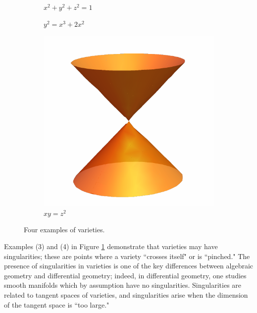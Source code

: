 \documentclass[12pt]{amsart}
\theoremstyle{plain}
\begin{document}
\begin{figure}[H]
\begin{subfigure}[t]{0.23\textwidth}
	\vspace{-1.5cm}
        \caption{$x^2 + y^2 + z^2 = 1$}
    \end{subfigure}
    \hfill
    \begin{subfigure}[t]{0.23\textwidth}
        \centering
        \vspace{-0cm} %
	 \vspace{0.1cm}
        \caption{$y^2 = x^3 + 2x^2$}
    \end{subfigure}
    \hfill
    \begin{subfigure}[t]{0.23\textwidth}
        \centering
        \vspace{-0.5cm} %
        \includegraphics[width=0.8 \linewidth]{../images/orange_cone}
        \vspace{-0.3cm} %
        \caption{$xy = z^2$}
    \end{subfigure}
    \caption{Four examples of varieties.}
	\label{figure:fourvarieties}
\end{figure}

Examples (3) and (4) in Figure \ref{figure:fourvarieties} demonstrate that varieties may have singularities;
these are points where a variety ``crosses itself" or is ``pinched."
The presence of singularities in varieties is one of the key differences between algebraic geometry and differential geometry; indeed, in differential geometry, one studies smooth manifolds which by assumption have no singularities.
Singularities are related to tangent spaces of varieties, and singularities arise when the dimension of the tangent space is ``too large."
\end{document}
